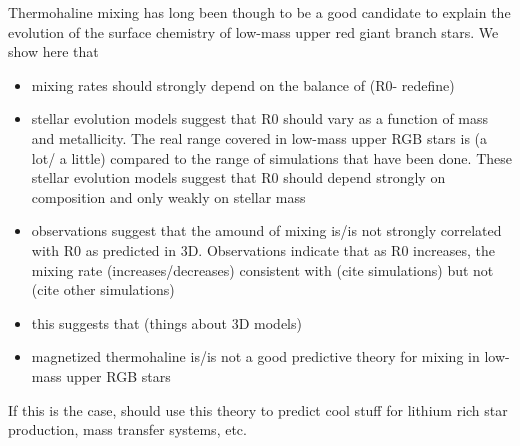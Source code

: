 Thermohaline mixing has long been though to be a good candidate to explain the evolution of the surface chemistry of low-mass upper red giant branch stars. We show here that

\begin{itemize}
    \item mixing rates should strongly depend on the balance of (R0- redefine)
    
    \item stellar evolution models suggest that R0 should vary as a function of mass and metallicity. The real range covered in low-mass upper RGB stars is (a lot/ a little) compared to the range of simulations that have been done. These stellar evolution models suggest that R0 should depend strongly on composition and only weakly on stellar mass
    
    \item observations suggest that the amound of mixing is/is not strongly correlated with R0 as predicted in 3D. Observations indicate that as R0 increases, the mixing rate (increases/decreases) consistent with (cite simulations) but not (cite other simulations)
    
    \item this suggests that (things about 3D models)
    
    \item magnetized thermohaline is/is not a good predictive theory for mixing in low-mass upper RGB stars
\end{itemize}
    
    If this is the case, should use this theory to predict cool stuff for lithium rich star production, mass transfer systems, etc. 


